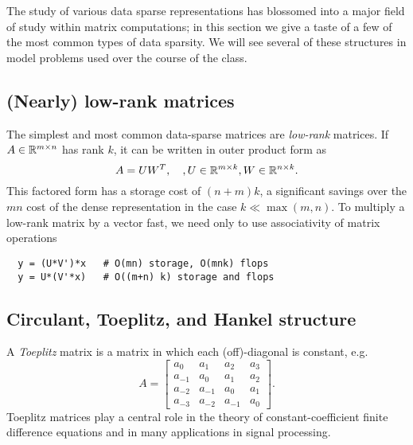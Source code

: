 \documentclass[12pt, leqno]{article} %
\begin{document}
The study of various data sparse representations has blossomed into a
major field of study within matrix computations; in this section we give
a taste of a few of the most common types of data sparsity.  We will
see several of these structures in model problems used over the course
of the class.

\subsection{(Nearly) low-rank matrices}

The simplest and most common data-sparse matrices are {\em low-rank}
matrices.  If $A \in \mathbb{R}^{m \times n}$ has rank $k$, it can be written
in outer product form as
\[
  A = UW^T, \quad, U \in \mathbb{R}^{m \times k}, W \in \mathbb{R}^{n \times k}.
\]
This factored form has a storage cost of $(n+m) k$, a significant savings
over the $mn$ cost of the dense representation in the case $k \ll \max(m,n)$.
To multiply a low-rank matrix by a vector fast, we need only to use
associativity of matrix operations
\begin{lstlisting}
  y = (U*V')*x   # O(mn) storage, O(mnk) flops
  y = U*(V'*x)   # O((m+n) k) storage and flops
\end{lstlisting}

\subsection{Circulant, Toeplitz, and Hankel structure}

A {\em Toeplitz} matrix is a matrix in which each (off)-diagonal is
constant, e.g.
\[
  A =
  \begin{bmatrix}
    a_0    & a_1    & a_2    & a_3 \\
    a_{-1} & a_0    & a_1    & a_2 \\
    a_{-2} & a_{-1} & a_0    & a_1 \\
    a_{-3} & a_{-2} & a_{-1} & a_0
  \end{bmatrix}.
\]
Toeplitz matrices play a central role in the theory of constant-coefficient
finite difference equations and in many applications in signal processing.
\end{document}
